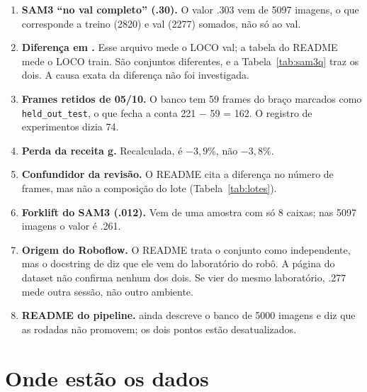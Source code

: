 \documentclass[11pt,a4paper]{article}
\begin{document}
\begin{enumerate}
  \item \textbf{SAM3 ``no val completo'' (.30).} O valor .303 vem de 5097 imagens,
    o que corresponde a treino (2820) e val (2277) somados, não só ao val.
  \item \textbf{Diferença em .} Esse arquivo mede o
    LOCO val; a tabela do README mede o LOCO train. São conjuntos diferentes, e a
    Tabela~\ref{tab:sam3q} traz os dois. A causa exata da diferença não foi
    investigada.
  \item \textbf{Frames retidos de 05/10.} O banco tem 59 frames do braço marcados
    como \texttt{held\_out\_test}, o que fecha a conta 221 $-$ 59 = 162. O registro
    de experimentos dizia 74.
  \item \textbf{Perda da receita g.} Recalculada, é $-3{,}9\%$, não $-3{,}8\%$.
  \item \textbf{Confundidor da revisão.} O README cita a diferença no número de
    frames, mas não a composição do lote (Tabela~\ref{tab:lotes}).
  \item \textbf{Forklift do SAM3 (.012).} Vem de uma amostra com só 8 caixas; nas
    5097 imagens o valor é .261.
  \item \textbf{Origem do Roboflow.} O README trata o conjunto como independente,
    mas o docstring de  diz que ele vem do laboratório
    do robô. A página do dataset não confirma nenhum dos dois. Se vier do mesmo
    laboratório, .277 mede outra sessão, não outro ambiente.
  \item \textbf{README do pipeline.}  ainda
    descreve o banco de 5000 imagens e diz que as rodadas não promovem; os dois
    pontos estão desatualizados.
\end{enumerate}

\section{Onde estão os dados}
\end{document}
